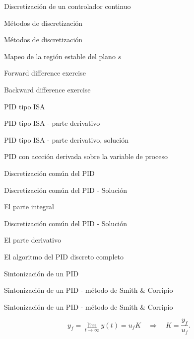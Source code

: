 \documentclass[presentation,aspectratio=1610]{beamer}
\begin{document}
\begin{frame}[label={sec:org86d23da}]{Discretización de un controlador continuo}
\begin{frame}[label={sec:org3ca2082}]{Métodos de discretización}
\begin{frame}[label={sec:orga78cff2}]{Métodos de discretización}
\begin{frame}[label={sec:org28bff53}]{Mapeo de la región estable del plano \(s\)}
\begin{frame}[label={sec:org9bb57fa}]{Forward difference exercise}
\begin{frame}[label={sec:orgaf8c1b0}]{Backward difference exercise}
\begin{frame}[label={sec:orgb2215e6}]{PID tipo ISA}
\begin{frame}[label={sec:orga06296a}]{PID tipo ISA - parte derivativo}
\begin{frame}[label={sec:org978e098}]{PID tipo ISA - parte derivativo, solución}
\begin{frame}[label={sec:orgf3b475b}]{PID con accción derivada sobre la variable de proceso}
\begin{frame}[label={sec:org5c3258e}]{Discretización común del PID}
\begin{frame}[label={sec:org95130b5}]{Discretización común del PID - Solución}
\begin{block}{El parte integral}
\begin{frame}[label={sec:org35f72c2}]{Discretización común del PID - Solución}
\begin{block}{El parte derivativo}
\begin{frame}[label={sec:org34749bc}]{El algoritmo del PID discreto completo}
\begin{frame}[label={sec:orgaefa60b}]{Sintonización de un PID}
\begin{frame}[label={sec:orge6db74e}]{Sintonización de un PID - método de Smith \& Corripio}
\begin{frame}[label={sec:org2be96d5}]{Sintonización de un PID - método de Smith \& Corripio}
\begin{center}
\end{center}

\[ y_f = \lim_{t\to\infty} y(t) = u_f K \quad \Rightarrow \quad K = \frac{y_f}{u_f}. \]
\end{frame}


\end{frame}
\end{frame}
\end{frame}
\end{block}
\end{frame}
\end{block}
\end{frame}
\end{frame}
\end{frame}
\end{frame}
\end{frame}
\end{frame}
\end{frame}
\end{frame}
\end{frame}
\end{frame}
\end{frame}
\end{frame}
\end{document}
